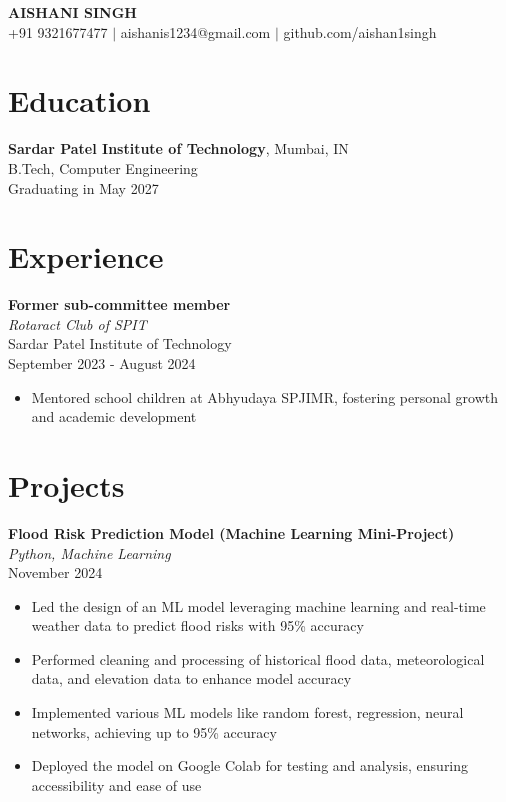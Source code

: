 \documentclass{article}
\begin{document}
\begin{center}
    {\LARGE\textbf{AISHANI SINGH}} \\
    \vspace{5pt}
    +91 9321677477 $\vert$ aishanis1234@gmail.com $\vert$ github.com/aishan1singh
\end{center}

\section*{Education}
\textbf{Sardar Patel Institute of Technology}, Mumbai, IN \\
B.Tech, Computer Engineering \\
Graduating in May 2027

\section*{Experience}
\textbf{Former sub-committee member} \\
\textit{Rotaract Club of SPIT} \\
Sardar Patel Institute of Technology \\
September 2023 - August 2024
\begin{itemize}
    \item Mentored school children at Abhyudaya SPJIMR, fostering personal growth and academic development
\end{itemize}

\section*{Projects}
\textbf{Flood Risk Prediction Model (Machine Learning Mini-Project)} \\
\textit{Python, Machine Learning} \\
November 2024
\begin{itemize}
    \item Led the design of an ML model leveraging machine learning and real-time weather data to predict flood risks with 95\% accuracy
    \item Performed cleaning and processing of historical flood data, meteorological data, and elevation data to enhance model accuracy
    \item Implemented various ML models like random forest, regression, neural networks, achieving up to 95\% accuracy
    \item Deployed the model on Google Colab for testing and analysis, ensuring accessibility and ease of use
\end{itemize}
\end{document}

